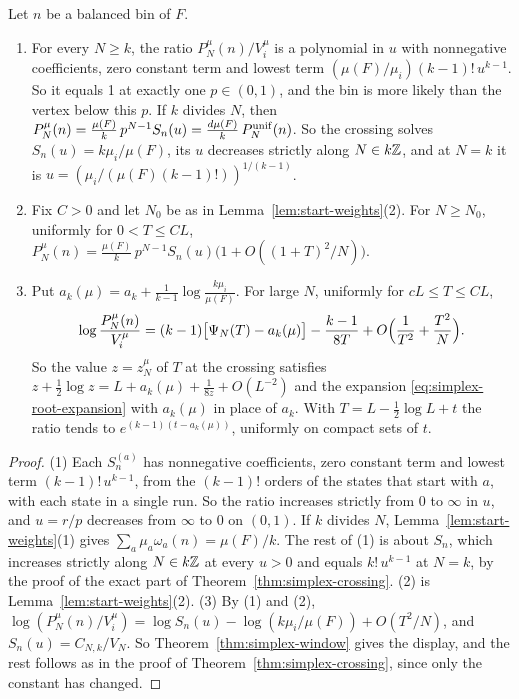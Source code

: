 \begin{theorem}\label{thm:start-crossings}
Let $n$ be a balanced bin of $F$.
\begin{enumerate}[(1)]
\item For every $N\ge k$, the ratio $P^\mu_N(n)/V^\mu_i$ is a polynomial in $u$
with nonnegative coefficients, zero constant term and lowest term
$(\mu(F)/\mu_i)(k-1)!\,u^{k-1}$. So it equals 1 at exactly one $p\in(0,1)$, and
the bin is more likely than the vertex below this $p$. If $k$ divides $N$, then
$P^\mu_N(n)=\frac{\mu(F)}k\,p^{N-1}S_n(u)=\frac{d\mu(F)}k\,P^{\rm unif}_N(n)$.
So the crossing solves $S_n(u)=k\mu_i/\mu(F)$, its $u$ decreases strictly along
$N\in k\mathbb Z$, and at $N=k$ it is $u=(\mu_i/(\mu(F)(k-1)!))^{1/(k-1)}$.
\item Fix $C>0$ and let $N_0$ be as in Lemma~\ref{lem:start-weights}(2). For
$N\ge N_0$, uniformly for $0<T\le CL$,
$P^\mu_N(n)=\frac{\mu(F)}k\,p^{N-1}S_n(u)\bigl(1+O((1+T)^2/N)\bigr)$.
\item Put $a_k(\mu)=a_k+\frac1{k-1}\log\frac{k\mu_i}{\mu(F)}$. For large $N$,
uniformly for $cL\le T\le CL$,
\[
 \log\frac{P^\mu_N(n)}{V^\mu_i}=(k-1)\bigl[\Psi_N(T)-a_k(\mu)\bigr]
 -\frac{k-1}{8T}+O\Bigl(\frac1{T^2}+\frac{T^2}N\Bigr).
\]
So the value $z=z^\mu_N$ of $T$ at the crossing satisfies
$z+\frac12\log z=L+a_k(\mu)+\frac1{8z}+O(L^{-2})$ and the expansion
\eqref{eq:simplex-root-expansion} with $a_k(\mu)$ in place of $a_k$. With
$T=L-\frac12\log L+t$ the ratio tends to $e^{(k-1)(t-a_k(\mu))}$, uniformly on
compact sets of $t$.
\end{enumerate}
\end{theorem}

\begin{proof}
(1) Each $S^{(a)}_n$ has nonnegative coefficients, zero constant term and lowest
term $(k-1)!\,u^{k-1}$, from the $(k-1)!$ orders of the states that start with
$a$, with each state in a single run. So the ratio increases strictly from 0 to
$\infty$ in $u$, and $u=r/p$ decreases from $\infty$ to 0 on $(0,1)$. If $k$
divides $N$, Lemma~\ref{lem:start-weights}(1) gives
$\sum_a\mu_a\omega_a(n)=\mu(F)/k$. The rest of (1) is about $S_n$, which
increases strictly along $N\in k\mathbb Z$ at every $u>0$ and equals $k!\,u^{k-1}$ at
$N=k$, by the proof of the exact part of Theorem~\ref{thm:simplex-crossing}.
(2) is Lemma~\ref{lem:start-weights}(2). (3) By (1) and (2),
$\log(P^\mu_N(n)/V^\mu_i)=\log S_n(u)-\log(k\mu_i/\mu(F))+O(T^2/N)$, and
$S_n(u)=C_{N,k}/V_N$. So Theorem~\ref{thm:simplex-window} gives the display, and
the rest follows as in the proof of Theorem~\ref{thm:simplex-crossing}, since
only the constant has changed.
\end{proof}

